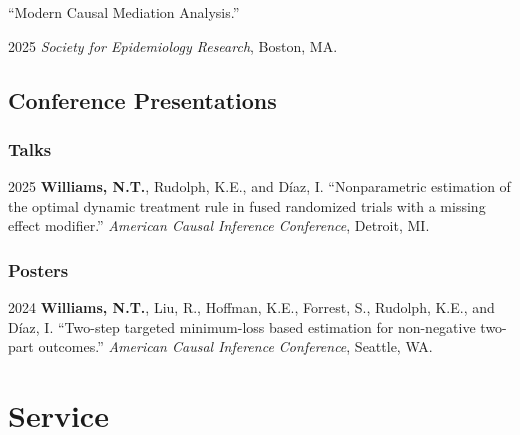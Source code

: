 \documentclass[12pt,letterpaper]{report}
\newcommand{\listitemspace}{0.15em}
\renewenvironment{itemize}
{\begin{list}{}{\setlength{\leftmargin}{0em}
            \setlength{\parskip}{0em}
            \setlength{\itemsep}{\listitemspace}
            \setlength{\parsep}{\listitemspace}}}
    {\end{list}}
\begin{document}
    \enquote{Modern Causal Mediation Analysis.} 
    
    \begin{itemize}
    
        \item \hspace{1em} 2025 \textit{Society for Epidemiology Research}, Boston, MA. 
    
    \end{itemize}

    \subsection*{Conference Presentations}
    
    \subsubsection{Talks}
    
    \begin{tablist}
    
    \item[2025] \tab \textbf{Williams, N.T.}, Rudolph, K.E., and Díaz, I. \enquote{Nonparametric estimation of the optimal dynamic treatment rule in fused randomized trials with a missing effect modifier.} \textit{American Causal Inference Conference}, Detroit, MI.
    
    \end{tablist}
    
    \subsubsection{Posters}

    \begin{tablist}
    
    \item[2024] \tab \textbf{Williams, N.T.}, Liu, R., Hoffman, K.E., Forrest, S., Rudolph, K.E., and Díaz, I. \enquote{Two-step targeted minimum-loss based estimation for non-negative two-part outcomes.} \textit{American Causal Inference Conference}, Seattle, WA.

    \end{tablist}
    
    \section*{Service}
    
\end{document}
